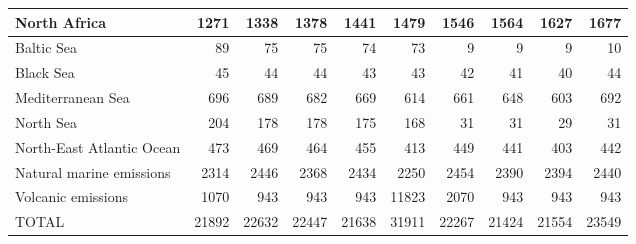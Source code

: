 \begin{table}
\begin{tabular}{|l|r|r|r|r|r|r|r|r|r|}
                  North Africa&   1271&   1338&   1378&   1441&   1479&   1546&   1564&   1627&   1677\\\hline
                    Baltic Sea&     89&     75&     75&     74&     73&      9&      9&      9&     10\\\hline
                     Black Sea&     45&     44&     44&     43&     43&     42&     41&     40&     44\\\hline
             Mediterranean Sea&    696&    689&    682&    669&    614&    661&    648&    603&    692\\\hline
                     North Sea&    204&    178&    178&    175&    168&     31&     31&     29&     31\\\hline
     North-East Atlantic Ocean&    473&    469&    464&    455&    413&    449&    441&    403&    442\\\hline
      Natural marine emissions&   2314&   2446&   2368&   2434&   2250&   2454&   2390&   2394&   2440\\\hline
            Volcanic emissions&   1070&    943&    943&    943&  11823&   2070&    943&    943&    943\\\hline\hline
                         TOTAL&  21892&  22632&  22447&  21638&  31911&  22267&  21424&  21554&  23549\\\hline
 \end{tabular}
 \end{table}
 
 

